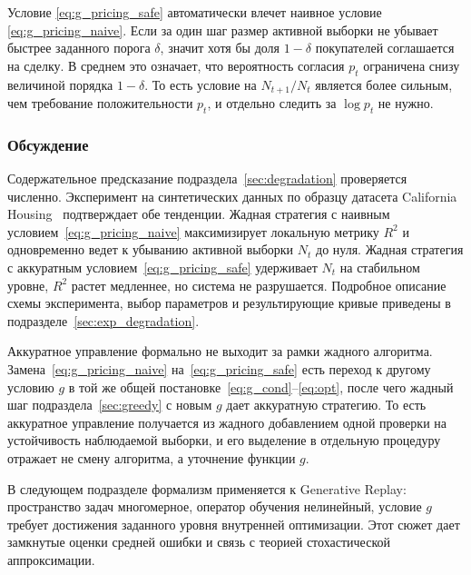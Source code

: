\documentclass[a4paper,14pt,oneside,openany]{extarticle}
\begin{document}
Условие \eqref{eq:g_pricing_safe} автоматически влечет наивное условие \eqref{eq:g_pricing_naive}. Если за один шаг размер активной выборки не убывает быстрее заданного порога $\delta$, значит хотя бы доля $1 - \delta$ покупателей соглашается на сделку. В среднем это означает, что вероятность согласия $p_t$ ограничена снизу величиной порядка $1 - \delta$. То есть условие на $N_{t+1}/N_t$ является более сильным, чем требование положительности $p_t$, и отдельно следить за $\log p_t$ не нужно. 


\subsubsection{Обсуждение}

Содержательное предсказание подраздела~\ref{sec:degradation} проверяется численно. Эксперимент на синтетических данных по образцу датасета California Housing~\cite{pace1997sparse} подтверждает обе тенденции. Жадная стратегия с наивным условием~\eqref{eq:g_pricing_naive} максимизирует локальную метрику $R^2$ и одновременно ведет к убыванию активной выборки $N_t$ до нуля. Жадная стратегия с аккуратным условием~\eqref{eq:g_pricing_safe} удерживает $N_t$ на стабильном уровне, $R^2$ растет медленнее, но система не разрушается. Подробное описание схемы эксперимента, выбор параметров и результирующие кривые приведены в подразделе~\ref{sec:exp_degradation}.

Аккуратное управление формально не выходит за рамки жадного алгоритма. Замена~\eqref{eq:g_pricing_naive} на~\eqref{eq:g_pricing_safe} есть переход к другому условию $g$ в той же общей постановке~\eqref{eq:g_cond}--\eqref{eq:opt}, после чего жадный шаг подраздела~\ref{sec:greedy} с новым $g$ дает аккуратную стратегию. То есть аккуратное управление получается из жадного добавлением одной проверки на устойчивость наблюдаемой выборки, и его выделение в отдельную процедуру отражает не смену алгоритма, а уточнение функции $g$.

В следующем подразделе формализм применяется к Generative Replay: пространство задач многомерное, оператор обучения нелинейный, условие $g$ требует достижения заданного уровня внутренней оптимизации. Этот сюжет дает замкнутые оценки средней ошибки и связь с теорией стохастической аппроксимации.
\end{document}
